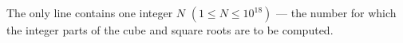 The only line contains one integer $N$ $(1 \le N \le 10^{18})$ --- the number for which the integer parts of the cube and square roots are to be computed.
